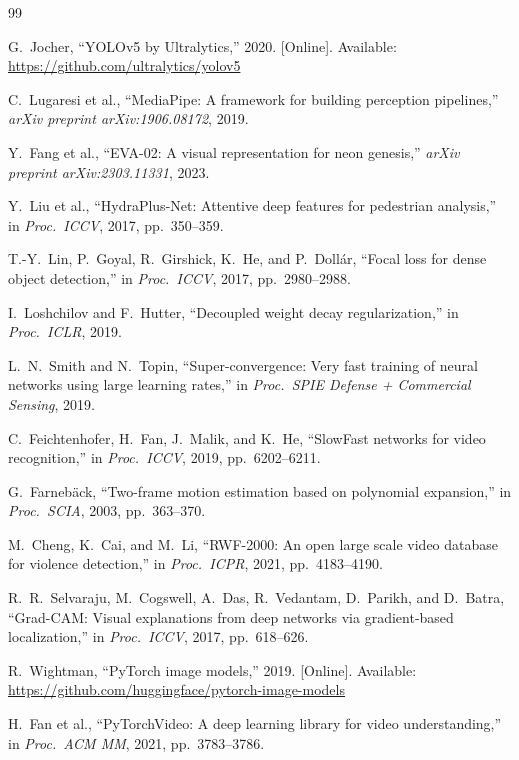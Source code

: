 \documentclass[11pt,a4paper]{article}
\begin{document}
\begin{thebibliography}{99}

 G.~Jocher, ``YOLOv5 by Ultralytics,'' 2020. [Online]. Available: \url{https://github.com/ultralytics/yolov5}

 C.~Lugaresi et al., ``MediaPipe: A framework for building perception pipelines,'' \emph{arXiv preprint arXiv:1906.08172}, 2019.

 Y.~Fang et al., ``EVA-02: A visual representation for neon genesis,'' \emph{arXiv preprint arXiv:2303.11331}, 2023.

 Y.~Liu et al., ``HydraPlus-Net: Attentive deep features for pedestrian analysis,'' in \emph{Proc.\ ICCV}, 2017, pp.~350--359.

 T.-Y.~Lin, P.~Goyal, R.~Girshick, K.~He, and P.~Doll{\'a}r, ``Focal loss for dense object detection,'' in \emph{Proc.\ ICCV}, 2017, pp.~2980--2988.

 I.~Loshchilov and F.~Hutter, ``Decoupled weight decay regularization,'' in \emph{Proc.\ ICLR}, 2019.

 L.~N.~Smith and N.~Topin, ``Super-convergence: Very fast training of neural networks using large learning rates,'' in \emph{Proc.\ SPIE Defense + Commercial Sensing}, 2019.

 C.~Feichtenhofer, H.~Fan, J.~Malik, and K.~He, ``SlowFast networks for video recognition,'' in \emph{Proc.\ ICCV}, 2019, pp.~6202--6211.

 G.~Farneb{\"a}ck, ``Two-frame motion estimation based on polynomial expansion,'' in \emph{Proc.\ SCIA}, 2003, pp.~363--370.

 M.~Cheng, K.~Cai, and M.~Li, ``RWF-2000: An open large scale video database for violence detection,'' in \emph{Proc.\ ICPR}, 2021, pp.~4183--4190.

 R.~R.~Selvaraju, M.~Cogswell, A.~Das, R.~Vedantam, D.~Parikh, and D.~Batra, ``Grad-CAM: Visual explanations from deep networks via gradient-based localization,'' in \emph{Proc.\ ICCV}, 2017, pp.~618--626.

 R.~Wightman, ``PyTorch image models,'' 2019. [Online]. Available: \url{https://github.com/huggingface/pytorch-image-models}

 H.~Fan et al., ``PyTorchVideo: A deep learning library for video understanding,'' in \emph{Proc.\ ACM MM}, 2021, pp.~3783--3786.

\end{thebibliography}
\end{document}
